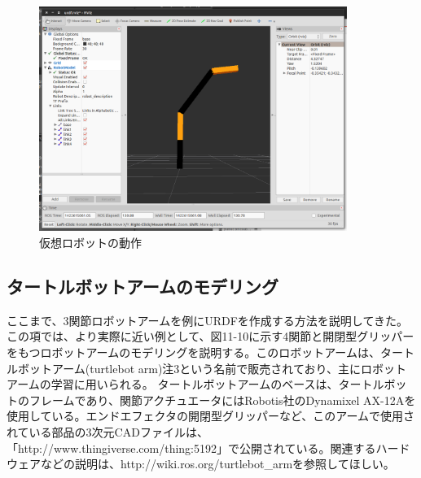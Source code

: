 \begin{figure}[htp]
  \centering
  \includegraphics[width=10cm]{pictures/chapter11/pic_11_09.png}
  \caption{仮想ロボットの動作}
\end{figure}

\subsection{タートルボットアームのモデリング}

ここまで、3関節ロボットアームを例にURDFを作成する方法を説明してきた。この項では、より実際に近い例として、図11-10に示す4関節と開閉型グリッパーをもつロボットアームのモデリングを説明する。このロボットアームは、タートルボットアーム(turtlebot arm)注3という名前で販売されており、主にロボットアームの学習に用いられる。
タートルボットアームのベースは、タートルボットのフレームであり、関節アクチュエータにはRobotis社のDynamixel AX-12Aを使用している。エンドエフェクタの開閉型グリッパーなど、このアームで使用されている部品の3次元CADファイルは、「http://www.thingiverse.com/thing:5192」で公開されている。関連するハードウェアなどの説明は、http://wiki.ros.org/turtlebot\_armを参照してほしい。

